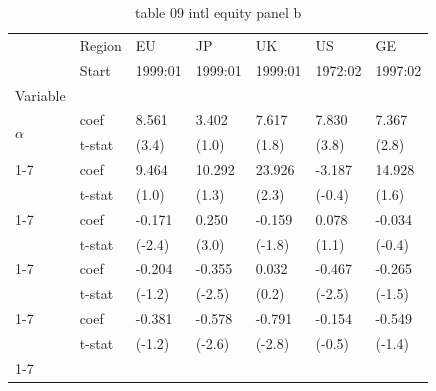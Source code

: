 \begin{table}[htbp]
  \centering
  \caption{table 09 intl equity panel b}
  \label{tab:table_09_intl_equity_panel_b}
  \begin{tabular}{lllllll}
\toprule
 & Region & EU & JP & UK & US & GE \\
 & Start & 1999:01 & 1999:01 & 1999:01 & 1972:02 & 1997:02 \\
Variable &  &  &  &  &  &  \\
\midrule
\multirow[t]{2}{*}{$\alpha$} & coef & 8.561 & 3.402 & 7.617 & 7.830 & 7.367 \\
 & t-stat & (3.4) & (1.0) & (1.8) & (3.8) & (2.8) \\
\cline{1-7}
\multirow[t]{2}{*}{$I_B$} & coef & 9.464 & 10.292 & 23.926 & -3.187 & 14.928 \\
 & t-stat & (1.0) & (1.3) & (2.3) & (-0.4) & (1.6) \\
\cline{1-7}
\multirow[t]{2}{*}{$R^e_m$} & coef & -0.171 & 0.250 & -0.159 & 0.078 & -0.034 \\
 & t-stat & (-2.4) & (3.0) & (-1.8) & (1.1) & (-0.4) \\
\cline{1-7}
\multirow[t]{2}{*}{$I_B R^e_m$} & coef & -0.204 & -0.355 & 0.032 & -0.467 & -0.265 \\
 & t-stat & (-1.2) & (-2.5) & (0.2) & (-2.5) & (-1.5) \\
\cline{1-7}
\multirow[t]{2}{*}{$I_B I_U R^e_m$} & coef & -0.381 & -0.578 & -0.791 & -0.154 & -0.549 \\
 & t-stat & (-1.2) & (-2.6) & (-2.8) & (-0.5) & (-1.4) \\
\cline{1-7}
\bottomrule
\end{tabular}

\end{table}
